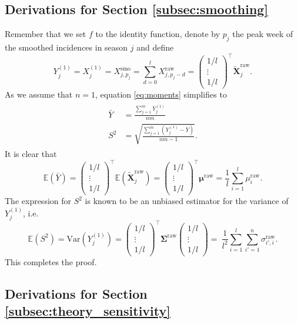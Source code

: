 \documentclass{article}
\begin{document}
\subsection{Derivations for Section \ref{subsec:smoothing}}

Remember that we set $f$ to the identity function, denote by $p_j$ the peak week of the smoothed incidences in season $j$ and define
$$
Y_j^{(1)} = X_j^{(1)} = X^\text{smo}_{j, p_j} = \sum_{d = 0}^l X^\text{raw}_{j, p_j - d} = \begin{pmatrix} 1/l \\ \vdots \\ 1/l \end{pmatrix}^\top \tilde{\mathbf{X}}^{\text{raw}}_j.
$$
As we assume that $n = 1$, equation \eqref{eq:moments} simplifies to
\begin{align}
\begin{split}
\bar{Y} & = \frac{\sum_{j = 1}^m Y_j^{(1)}}{nm}\\
S^2 & = \sqrt{ \frac{\sum_{j = 1}^m (Y_j^{(1)}  - \bar{Y})}{nm - 1}}.
\end{split}
\end{align}
It is clear that
$$
\mathbb{E}(\bar{Y}) = \begin{pmatrix} 1/l \\ \vdots \\ 1/l \end{pmatrix}^\top \mathbb{E}(\tilde{\mathbf{X}}^{\text{raw}}_j) = \begin{pmatrix} 1/l \\ \vdots \\ 1/l \end{pmatrix}^\top \boldsymbol{\mu}^\text{raw} = \frac{1}{l}\sum_{i = 1}^l \mu^\text{raw}_i.
$$
The expression for $S^2$ is known to be an unbiased estimator for the variance of $Y_j^{(1)}$, i.e.
$$
\mathbb{E}(S^2) = \text{Var}(Y_j^{(1)}) = \begin{pmatrix} 1/l \\ \vdots \\ 1/l \end{pmatrix}^\top \mathbf{\Sigma}^\text{raw} \begin{pmatrix} 1/l \\ \vdots \\ 1/l \end{pmatrix} = \ \frac{1}{l^2} \sum_{i = 1}^l \sum_{i' = 1}^n \sigma^\text{raw}_{i', i}.
$$
This completes the proof.

\subsection{Derivations for Section \ref{subsec:theory_sensitivity}}
\end{document}
